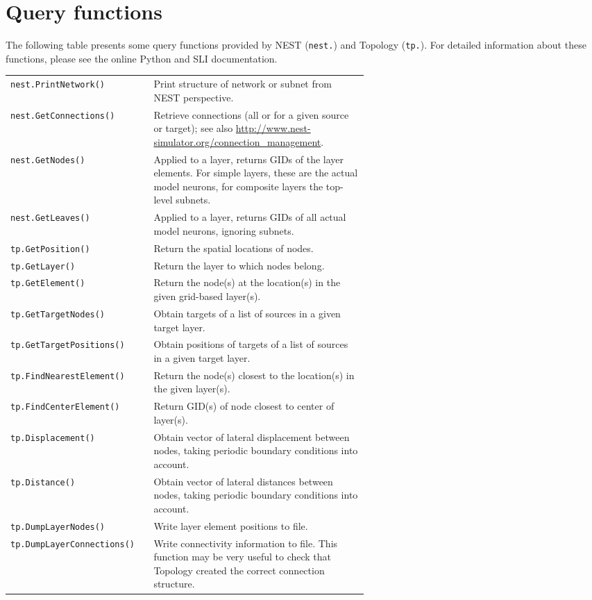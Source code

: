 \documentclass[a4paper,12pt]{report}
\begin{document}
\section{Query functions}\label{sec:queries}

The following table presents some query functions provided by NEST
(\lstinline!nest.!) and Topology (\lstinline!tp.!). For detailed
information about these functions, please see the online Python and
SLI documentation.

\renewcommand{\arraystretch}{1.2}
\begin{longtable}{lp{0.6\linewidth}}
  \lstinline!nest.PrintNetwork()! & Print structure of network or
  subnet
  from NEST perspective. \\
  \lstinline!nest.GetConnections()! & Retrieve connections
  (all or for a given source or target); see also
  \url{http://www.nest-simulator.org/connection_management}. \\
  \lstinline!nest.GetNodes()! & Applied to a layer, returns GIDs of
  the layer elements. For simple layers, these are the actual model
  neurons,
  for composite layers the top-level subnets.\\
  \lstinline!nest.GetLeaves()! & Applied to a layer, returns GIDs of
  all
  actual model neurons, ignoring subnets.\\
  \lstinline!tp.GetPosition()!  &
  Return the spatial locations of nodes.\\
  \lstinline!tp.GetLayer()!  &
  Return the layer to which nodes belong.\\
  \lstinline!tp.GetElement()!  &
  Return the node(s) at the location(s) in the given grid-based layer(s).\\
  \lstinline!tp.GetTargetNodes()!  &
  Obtain targets of a list of sources in a given target layer.\\
  \lstinline!tp.GetTargetPositions()!  &
  Obtain positions of targets of a list of sources in a given target layer.\\
  \lstinline!tp.FindNearestElement()!  & Return the node(s) closest to
  the location(s) in the given
  layer(s).\\
  \lstinline!tp.FindCenterElement()!  &
  Return GID(s) of node closest to center of layer(s).\\
  \lstinline!tp.Displacement()!  & Obtain vector of lateral
  displacement between nodes, taking
  periodic boundary conditions into account. \\
  \lstinline!tp.Distance()!  & Obtain vector of lateral distances
  between nodes, taking periodic
  boundary conditions into account.\\
  \lstinline!tp.DumpLayerNodes()!  &
  Write layer element positions to file.\\
  \lstinline!tp.DumpLayerConnections()!  & Write connectivity
  information to file. This function may be very useful to check that
  Topology created the correct connection structure.
\end{longtable}
\end{document}
